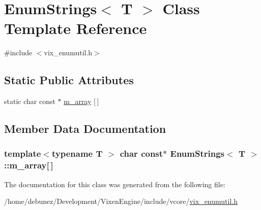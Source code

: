 \hypertarget{classEnumStrings}{}\section{Enum\+Strings$<$ T $>$ Class Template Reference}
\label{classEnumStrings}


{\ttfamily \#include $<$vix\+\_\+enumutil.\+h$>$}

\subsection*{Static Public Attributes}
\begin{DoxyCompactItemize}
\item 
static char const $\ast$ \hyperlink{classEnumStrings_a0cba69dba176cde04a18401045e1addb}{m\+\_\+array} \mbox{[}$\,$\mbox{]}
\end{DoxyCompactItemize}


\subsection{Member Data Documentation}
\hypertarget{classEnumStrings_a0cba69dba176cde04a18401045e1addb}{}
\subsubsection[{m\+\_\+array}]{\setlength{\rightskip}{0pt plus 5cm}template$<$typename T $>$ char const$\ast$ {\bf Enum\+Strings}$<$ T $>$\+::m\+\_\+array\mbox{[}$\,$\mbox{]}\hspace{0.3cm}{\ttfamily [static]}}\label{classEnumStrings_a0cba69dba176cde04a18401045e1addb}


The documentation for this class was generated from the following file\+:\begin{DoxyCompactItemize}
\item 
/home/debunez/\+Development/\+Vixen\+Engine/include/vcore/\hyperlink{vix__enumutil_8h}{vix\+\_\+enumutil.\+h}\end{DoxyCompactItemize}
